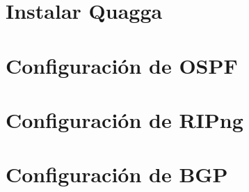 \documentclass{article}
\begin{document}
\section{Instalar Quagga}

\section{Configuración de OSPF}


\section{Configuración de RIPng}

\section{Configuración de BGP}

%
\end{document}
